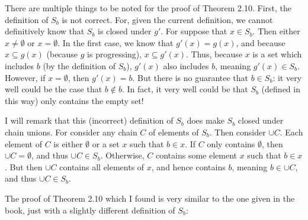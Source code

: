 \documentclass{article}
\theoremstyle{definition}
\begin{document}
There are multiple things to be noted for the proof of Theorem 2.10. First, the definition of $S_b$ is not correct. For, given the current definition, we cannot 
definitively know that $S_b$ is closed under $g'$. For suppose that $x\in S_b$. Then either $x\ne\emptyset$ or $x=\emptyset$. In the first case, we know that 
$g'(x)=g(x)$, and because $x\subseteq g(x)$ (because $g$ is progressing), $x\subseteq g'(x)$. Thus, because $x$ is a set which includes $b$ (by the 
definition of $S_b$), $g'(x)$ also includes $b$, meaning $g'(x)\in S_b$. However, if $x=\emptyset$, then $g'(x)=b$. But there is no guarantee that 
$b\in S_b$: it very well could be the case that $b\notin b$. In fact, it very well could be that $S_b$ (defined in this way) only contains the empty set!

I will remark that this (incorrect) definition of $S_b$ does make $S_b$ closed under chain unions. For consider any chain $C$ of elements of $S_b$. Then 
consider $\cup C$. Each element of $C$ is either $\emptyset$ or a set $x$ such that $b\in x$. If $C$ only contains $\emptyset$, then $\cup C=\emptyset$, and 
thus $\cup C\in S_b$. Otherwise, $C$ contains some element $x$ such that $b\in x$. But then $\cup C$ contains all elements of $x$, and hence contains $b$, meaning 
$b\in\cup C$, and thus $\cup C\in S_b$.

The proof of Theorem 2.10 which I found is very similar to the one given in the book, just with a slightly different definition of $S_b$:
\end{document}
